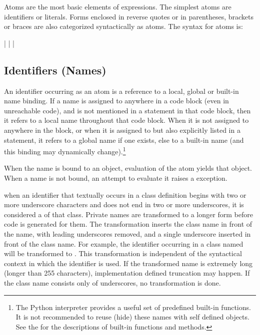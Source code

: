 Atoms are the most basic elements of expressions.  The simplest atoms
are identifiers or literals.  Forms enclosed in
reverse quotes or in parentheses, brackets or braces are also
categorized syntactically as atoms.  The syntax for atoms is:

\begin{productionlist}
             { |  | }
             { | }
\end{productionlist}


\subsection{Identifiers (Names)\label{atom-identifiers}}

An identifier occurring as an atom is a reference to a local, global
or built-in name binding.  If a name is assigned to anywhere in a code
block (even in unreachable code), and is not mentioned in a
 statement in that code block, then it refers to a local
name throughout that code block.  When it is not assigned to anywhere
in the block, or when it is assigned to but also explicitly listed in
a  statement, it refers to a global name if one exists,
else to a built-in name (and this binding may dynamically
change).\footnote{The Python interpreter provides a useful set of
  predefined built-in functions.  It is not recommended to reuse
  (hide) these names with self defined objects.  See the
   for
  the descriptions of built-in functions and methods.}

When the name is bound to an object, evaluation of the atom yields
that object.  When a name is not bound, an attempt to evaluate it
raises a  exception.

%
%
%
when an identifier that textually occurs in a class definition begins
with two or more underscore characters and does not end in two or more
underscores, it is considered a  of that class.
Private names are transformed to a longer form before code is
generated for them.  The transformation inserts the class name in
front of the name, with leading underscores removed, and a single
underscore inserted in front of the class name.  For example, the
identifier  occurring in a class named  will be
transformed to .  This transformation is independent
of the syntactical context in which the identifier is used.  If the
transformed name is extremely long (longer than 255 characters),
implementation defined truncation may happen.  If the class name
consists only of underscores, no transformation is done.


